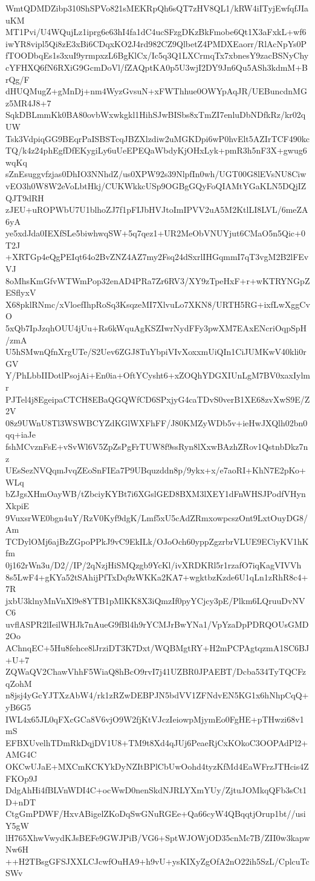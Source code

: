 WmtQDMDZibp310ShSPVo821sMEKRpQh6sQT7zHV8QL1/kRW4iITyjEwfqfJIauKM
MT1Pvi/U4WQujLz1iprg6e63hI4fa1dC4ucSFzgDKzBkFmobe6Qt1X3aFxkL+wf6
iwYR8vipl5Qi8zE3xBi6CDqxKO2J4rd982CZ9QlbetZ4PMDXEaorr/RlAcNpYs0P
fTOODbqEs1s3xuI9yrmpxzL6BgKlCx/Ic5q3Q1LXCrmqTx7xbnesY9zacBSNyChy
cYFHXQ6fN6RXiG9GcmDoVl/fZAQptKA0p5U3wjI2DY9Jn6Qu5ASh3kdmM+BrQg/F
dHUQMugZ+gMnDj+nm4WyzGvsuN+xFWThhue0OWYpAqJR/UEBuncdnMGz5MR4J8+7
SqkDBLmmKk0BA80ovbWxwkgkl1HihSJwBISbs8xTmZI7enluDbNDfkRz/kr02qUW
Tsk3VdpiqGG9BEqrPaISBSTcqJBZXlzdiw2uMGKDpi6wP0hvElt5AZIrTCF490kc
TQ/k4z24phEgfDfEKygiLy6uUeEPEQaWbdyKjOHxLyk+pmR3h5nF3X+gwug6wqKq
sZnEsuggvfzjas0DhIO3NNhdZ/us0XPW92s39NlpfIn0wh/UGT00G8lEVsNU8Ciw
vEO3h0W8W2eVoLbtHkj/CUKWkkcUSp9OGBgGQyFoQIAMtYGaKLN5DQjIZQJT9dRH
zJEU+uROPWbU7U1blhoZJ7f1pFIJbHVJtoImIPVV2uA5M2KtlLI8LVL/6meZA6yA
ye5xdJda0IEXfSLe5biwhwqSW+5q7qez1+UR2MeObVNUYjut6CMaO5n5Qic+0T2J
+XRTGp4eQgPEIqt64o2BvZNZ4AZ7my2Fsq24dSxrlIHGqmmI7qT3vgM2B2lFEvVJ
8oMhsKmGfvWTWmPop32enAD4PRa7Zr6RV3/XY9zTpeHxF+r+wKTRYNGpZESflyxV
X68pklRNmc/xVloefIhpRoSq3KsqzeMI7XlvuLo7XKN8/URTH5RG+ixfLwXggCvO
5xQb7IpJzqhOUU4jUu+Rs6kWquAgKSZIwrNydFFy3pwXM7EAxENcriOqpSpH/zmA
U5hSMwnQfnXrgUTe/S2Uev6ZGJ8TuYbpiVIvXoxxmUiQIn1CiJUMKwV40kli0rGV
Y/PhLbbIIDotlPsojAi+En0ia+OftYCysht6+xZOQhYDGXIUnLgM7BV0xaxIylmr
PJTel4j8EgeipaCTCH8EBaQGQWfCD6SPxjyG4caTDvS0verB1XE68zvXwS9E/Z2V
08z9UWnU8Tl3WSWBCYZdKGlWXFhFF/J80KMZyWDb5v+ieHwJXQlh02bn0qq+iaJe
fshMCvznFsE+vSvWl6V5ZpZsPgFrTUW8f9ssRyn8lXxwBAzhZRov1QstnbDkz7nz
UEsSezNVQqmJvqZEoSnFIEa7P9UBquzddn8p/9ykx+x/e7aoRI+KhN7E2pKo+WLq
bZJgsXHmOayWB/tZbciyKYBt7i6XGslGED8BXM3lXEY1dFnWHSJPodfVHynXkpiE
9VuxsrWE0bgn4uY/RzV0Kyf9dgK/Lmf5xU5cAdZRmxowpcszOnt9LxtOuyDG8/Am
TCDylOMj6ajBzZGpoPPkJ9vC9EkILk/OJoOch60yppZgzrbrVLUE9ECiyKV1hKfm
0j162rWn3u/D2//IP/2qNzjHiSMQzgb9YcKl/ivXRDKRl5r1rzafO7iqKagVIVVh
8s5LwF4+gKYa52tSAhijPfTxDq9zWKKa2KA7+wgktbzKzde6U1qLn1zRhR8c4+7R
jxbU3klnyMnVnXl9e8YTB1pMlKK8X3iQmzIf0pyYCjcy3pE/Plkm6LQruuDvNVC6
uvflASPR2lIeilWHJk7nAueG9fBl4h9rYCMJrBwYNa1/VpYzaDpPDRQOUsGMD2Oo
AChnqEC+5Hu8fehce8lJrziDT3K7Dxt/WQBMgtRY+H2mPCPAgtqzmA1SC6BJ+U+7
ZQWaQV2ChawVhhF5WiaQ8hBcO9rvI7j41UZBR0JPAEBT/Dcba534TyTQCFzqZohM
n8jsj4yGcYJTXzAbW4/rk1zRZwDEBPJN5bdVV1ZFNdvEN5KG1x6hNhpCqQ+yB6G5
IWL4x65JL0qFXcGCa8V6vjO9W2fjKtVJczIeiowpMjymEo0FgHE+pTHwzi68v1mS
EFBXUvelhTDmRkDqjDV1U8+TM9t8Xd4qJUj6PeaeRjCxKOkoC3OOPAdPl2+AMG4C
OKCwUJaE+MXCmKCKYkDyNZItBPlCbUwOohd4tyzKfMd4EaWFrzJTHcis4ZFKOp9J
DdgAhHi4fBLVnWDI4C+ocWwD0nenSkdNJRLYXmYUy/ZjtuJOMkqQFb3sCt1D+nDT
CtgGmPDWF/HxvABigelZKoDqSwGNuRGEe+Qa66cyW4QBqqtjOrup1bt//usiY5gW
lH765XhwVwydKJsBEFe9GWJPiB/VG6+SptWJOWjOD35cnMc7B/ZII0w3kapwNw6H
++H2TBsgGFSJXXLCJcwfOuHA9+h9vU+ysKIXyZgOfA2nO22ih5SzL/CplcuTcSWv
